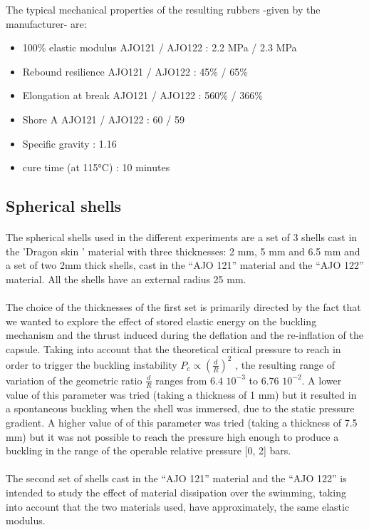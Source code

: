 The typical mechanical properties of the resulting rubbers -given by the manufacturer- are:
\begin{itemize}
	\item 100\% elastic modulus AJO121 / AJO122 : 2.2 MPa / 2.3 MPa
	\item Rebound resilience AJO121 / AJO122 : 45\% / 65\%
	\item Elongation at break AJO121 / AJO122 : 560\% / 366\%
	\item Shore A AJO121 / AJO122 : 60 / 59 
	\item Specific gravity : 1.16
	\item cure time (at 115°C) : 10 minutes
\end{itemize}


\subsection{Spherical shells}
\label{sec:Spherical_shells}
\paragraph{}
The spherical shells used in the different experiments are a set of 3 shells cast in the 'Dragon skin ' material with three thicknesses: 2 mm, 5 mm and 6.5 mm and a set of two 2mm thick shells, cast in the "`AJO 121"' material and the "`AJO 122"' material. All the shells have an external radius 25 mm.
\paragraph{}
The choice of the thicknesses of the first set is primarily directed by the fact that we wanted to explore the effect of stored elastic energy on the buckling mechanism and the thrust induced during the deflation and the re-inflation of the capsule. Taking into account that the theoretical critical pressure to reach in order to trigger the buckling instability $P_c \propto (\frac{d}{R})^2$ \cite{cqpcritic2011} , the resulting range of variation of the geometric ratio $\frac{d}{R}$ ranges from $6.4$ $10^{-3}$ to $6.76$ $10^{-2}$.
A lower value of this parameter was tried (taking a thickness of 1 mm) but it resulted in a spontaneous buckling when the shell was immersed, due to the static pressure gradient.
A higher value of of this parameter was tried (taking a thickness of 7.5 mm) but it was not possible to reach the pressure high enough to produce a buckling in the range of the operable relative pressure [0, 2] bars.
\paragraph{}
The second set of shells cast in the "`AJO 121"' material and the "`AJO 122"' is intended to study the effect of material dissipation over the swimming, taking into account that the two materials used, have approximately, the same elastic modulus.

